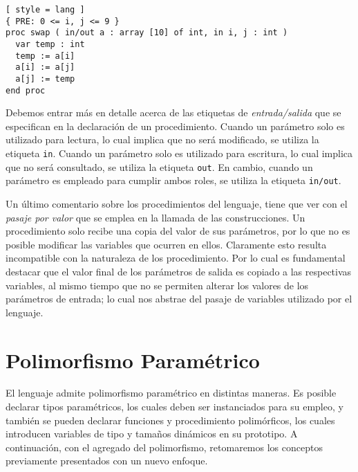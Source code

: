 \begin{lstlisting}[ style = lang ]
{ PRE: 0 <= i, j <= 9 }
proc swap ( in/out a : array [10] of int, in i, j : int )
  var temp : int
  temp := a[i]
  a[i] := a[j]
  a[j] := temp
end proc
\end{lstlisting}

Debemos entrar más en detalle acerca de las etiquetas de \textit{entrada/salida} que se especifican en la declaración de un procedimiento.
Cuando un parámetro solo es utilizado para lectura, lo cual implica que no será modificado, se utiliza la etiqueta \lstinline[style = lang]{in}.
Cuando un parámetro solo es utilizado para escritura, lo cual implica que no será consultado, se utiliza la etiqueta \lstinline[style = lang]{out}.
En cambio, cuando un parámetro es empleado para cumplir ambos roles, se utiliza la etiqueta \lstinline[style = lang]{in/out}.

Un último comentario sobre los procedimientos del lenguaje, tiene que ver con el \textit{pasaje por valor} que se emplea en la llamada de las construcciones.
Un procedimiento solo recibe una copia del valor de sus parámetros, por lo que no es posible modificar las variables que ocurren en ellos.
Claramente esto resulta incompatible con la naturaleza de los procedimiento.
Por lo cual es fundamental destacar que el valor final de los parámetros de salida es copiado a las respectivas variables, al mismo tiempo que no se permiten alterar los valores de los parámetros de entrada; lo cual nos abstrae del pasaje de variables utilizado por el lenguaje.




\section{Polimorfismo Paramétrico}

El lenguaje admite polimorfismo paramétrico en distintas maneras.
Es posible declarar tipos paramétricos, los cuales deben ser instanciados para su empleo, y también se pueden declarar funciones y procedimiento polimórficos, los cuales introducen variables de tipo y tamaños dinámicos en su prototipo.
A continuación, con el agregado del polimorfismo, retomaremos los conceptos previamente presentados con un nuevo enfoque.

